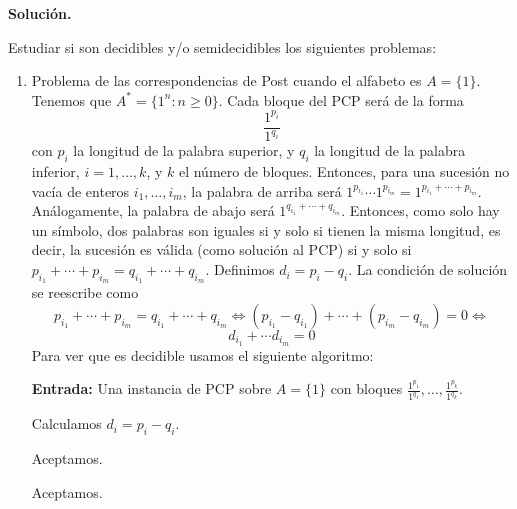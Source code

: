 \documentclass[12pt]{article}
\begin{document}
    \newpage
    \setcounter{ejercicio}{0} %
    \noindent
    \textbf{Solución.}

    \begin{ejercicio}[2 puntos]
        Estudiar si son decidibles y/o semidecidibles los siguientes problemas:
        \begin{enumerate}
            \item Problema de las correspondencias de Post cuando el alfabeto es $A = \{1\}$. \\
            
            Tenemos que $A^{*} = \{1^n : n \geq 0\}$. Cada bloque del PCP será de la forma 
            $$\dfrac{1^{p_i}}{1^{q_i}}$$ 
            con $p_i$ la longitud de la palabra superior, y $q_i$ la longitud de la palabra inferior, $i = 1, \ldots, k$, y 
            $k$ el número de bloques. Entonces, para una sucesión no vacía de enteros $i_1, \ldots, i_m$, la palabra de arriba 
            será $1^{p_{i_1}} \cdots 1^{p_{i_m}} = 1^{p_{i_1} + \cdots + p_{i_m}}$. Análogamente, la palabra de abajo será 
            $1^{q_{i_1} + \cdots + q_{i_m}}$. Entonces, como solo hay un símbolo, dos palabras son iguales si y solo si tienen
            la misma longitud, es decir, la sucesión es válida (como solución al PCP) si y solo si 
            $p_{i_1} + \cdots + p_{i_m} = q_{i_1} + \cdots + q_{i_m}$. Definimos $d_i = p_i - q_i$. La condición de solución
            se reescribe como
            $$p_{i_1} + \cdots + p_{i_m} = q_{i_1} + \cdots + q_{i_m} \iff 
            (p_{i_1} - q_{i_1}) + \cdots + (p_{i_m} - q_{i_m}) = 0 \iff$$$$ d_{i_1} + \cdots d_{i_m} = 0$$
            Para ver que es decidible usamos el siguiente algoritmo:

            \begin{algorithm}
                \caption{MT $M_{P_1}$}
                \begin{algorithmic}
                    \State \textbf{Entrada:} Una instancia de PCP sobre $A=\{1\}$ con bloques
                    $\frac{1^{p_1}}{1^{q_1}},\dots,\frac{1^{p_k}}{1^{q_k}}$.

                        \State Calculamos $d_i = p_i-q_i$.
                    \EndFor

                        \State Aceptamos.
                    \EndIf

                        \State Aceptamos.
                    \EndIf


\end{algorithmic}
\end{algorithm}
\end{enumerate}
\end{ejercicio}
\end{document}
